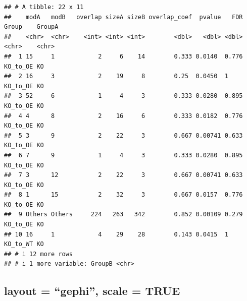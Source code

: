 \documentclass[
]{book}
\begin{document}
\begin{verbatim}
## # A tibble: 22 x 11
##    modA   modB   overlap sizeA sizeB overlap_coef  pvalue   FDR Group    GroupA
##    <chr>  <chr>    <int> <int> <int>        <dbl>   <dbl> <dbl> <chr>    <chr> 
##  1 15     1            2     6    14        0.333 0.0140  0.776 KO_to_OE KO    
##  2 16     3            2    19     8        0.25  0.0450  1     KO_to_OE KO    
##  3 52     6            1     4     3        0.333 0.0280  0.895 KO_to_OE KO    
##  4 4      8            2    16     6        0.333 0.0182  0.776 KO_to_OE KO    
##  5 3      9            2    22     3        0.667 0.00741 0.633 KO_to_OE KO    
##  6 7      9            1     4     3        0.333 0.0280  0.895 KO_to_OE KO    
##  7 3      12           2    22     3        0.667 0.00741 0.633 KO_to_OE KO    
##  8 1      15           2    32     3        0.667 0.0157  0.776 KO_to_OE KO    
##  9 Others Others     224   263   342        0.852 0.00109 0.279 KO_to_OE KO    
## 10 16     1            4    29    28        0.143 0.0415  1     KO_to_WT KO    
## # i 12 more rows
## # i 1 more variable: GroupB <chr>
\end{verbatim}

\subsection{layout = ``gephi'', scale = TRUE}\label{layout-gephi-scale-true}
\end{document}
